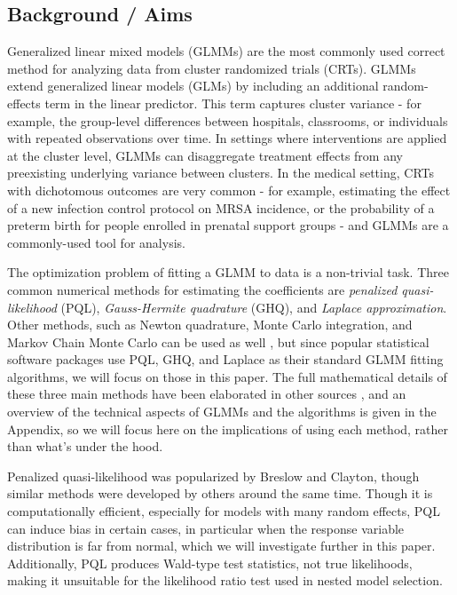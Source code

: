 \documentclass{article}
\begin{document}
\newpage

\begin{flushleft}
\section{Background / Aims}

Generalized linear mixed models (GLMMs) are the most commonly used correct method for analyzing data from cluster randomized trials (CRTs). GLMMs extend generalized linear models (GLMs) by including an additional random-effects term in the linear predictor. This term captures cluster variance - for example, the group-level differences between hospitals, classrooms, or individuals with repeated observations over time. In settings where interventions are applied at the cluster level, GLMMs can disaggregate treatment effects from any preexisting underlying variance between clusters. In the medical setting, CRTs with dichotomous outcomes are very common - for example, estimating the effect of a new infection control protocol on MRSA incidence, or the probability of a preterm birth for people enrolled in prenatal support groups - and GLMMs are a commonly-used tool for analysis. 


The optimization problem of fitting a GLMM to data is a non-trivial task. Three common numerical methods for estimating the coefficients are \textit{penalized quasi-likelihood} (PQL), \textit{Gauss-Hermite quadrature} (GHQ), and \textit{Laplace approximation}. Other methods, such as Newton quadrature, Monte Carlo integration, and Markov Chain Monte Carlo can be used as well \cite{zhang_fitting_2011}, but since popular statistical software packages use PQL, GHQ, and Laplace as their standard GLMM fitting algorithms, we will focus on those in this paper. The full mathematical details of these three main methods have been elaborated in other sources \cite{wolfinger_generalized_1993}\cite{pinheiro_efficient_2006}, and an overview of the technical aspects of GLMMs and the algorithms is given in the Appendix, so we will focus here on the implications of using each method, rather than what's under the hood.

Penalized quasi-likelihood was popularized by Breslow and Clayton\cite{breslow_approximate_1993}, though similar methods were developed by others\cite{zeger_models_1988}\cite{engel_simple_1994} around the same time. Though it is computationally efficient, especially for models with many random effects, PQL can induce bias in certain cases, in particular when the response variable distribution is far from normal\cite{agresti_categorical_2013}\cite{rodriguez_assessment_1995}\cite{breslow_bias_1995}\cite{lin_bias_1996}, which we will investigate further in this paper. Additionally, PQL produces Wald-type test statistics, not true likelihoods, making it unsuitable for the likelihood ratio test used in nested model selection\cite{zhang_fitting_2011}\cite{pinheiro_efficient_2006}\cite{ng_estimation_2006}.


\end{flushleft}
\end{document}
